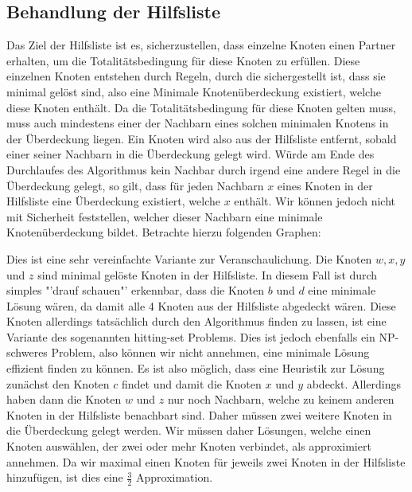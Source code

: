 \documentclass[12pt,onecolumn, notitlepage]{scrartcl}
\begin{document}
\subsection{Behandlung der Hilfsliste}
Das Ziel der Hilfsliste ist es, sicherzustellen, dass einzelne Knoten einen Partner erhalten, um die Totalitätsbedingung für diese Knoten zu erfüllen. Diese einzelnen Knoten entstehen durch Regeln, durch die sichergestellt ist, dass sie minimal gelöst sind, also eine Minimale Knotenüberdeckung existiert, welche diese Knoten enthält. Da die Totalitätsbedingung für diese Knoten gelten muss, muss auch mindestens einer der Nachbarn eines solchen minimalen Knotens in der Überdeckung liegen. Ein Knoten wird also aus der Hilfsliste entfernt, sobald einer seiner Nachbarn in die Überdeckung gelegt wird. Würde am Ende des Durchlaufes des Algorithmus kein Nachbar durch irgend eine andere Regel in die Überdeckung gelegt, so gilt, dass für jeden Nachbarn $x$ eines Knoten in der Hilfsliste eine Überdeckung existiert, welche $x$ enthält. Wir können jedoch nicht mit Sicherheit feststellen, welcher dieser Nachbarn eine minimale Knotenüberdeckung bildet. Betrachte hierzu folgenden Graphen:\newline
\begin{center}
\end{center}
Dies ist eine sehr vereinfachte Variante zur Veranschaulichung. Die Knoten $w,x,y$ und $z$ sind minimal gelöste Knoten in der Hilfsliste. In diesem Fall ist durch simples "'drauf schauen"' erkennbar, dass die Knoten $b$ und $d$ eine minimale Lösung wären, da damit alle 4 Knoten aus der Hilfsliste abgedeckt wären. Diese Knoten allerdings tatsächlich durch den Algorithmus finden zu lassen, ist eine Variante des sogenannten \glqq hitting-set Problems\grqq{}. Dies ist jedoch ebenfalls ein NP-schweres Problem, also können wir nicht annehmen, eine minimale Lösung effizient finden zu können. Es ist also möglich, dass eine Heuristik zur Lösung zunächst den Knoten $c$ findet und damit die Knoten $x$ und $y$ abdeckt. Allerdings haben dann die Knoten $w$ und $z$ nur noch Nachbarn, welche zu keinem anderen Knoten in der Hilfsliste benachbart sind. Daher müssen zwei weitere Knoten in die Überdeckung gelegt werden. Wir müssen daher Lösungen, welche einen Knoten auswählen, der zwei oder mehr Knoten verbindet, als approximiert annehmen. Da wir maximal einen Knoten für jeweils zwei Knoten in der Hilfsliste hinzufügen, ist dies eine $\frac{3}{2}$ Approximation.
\end{document}
